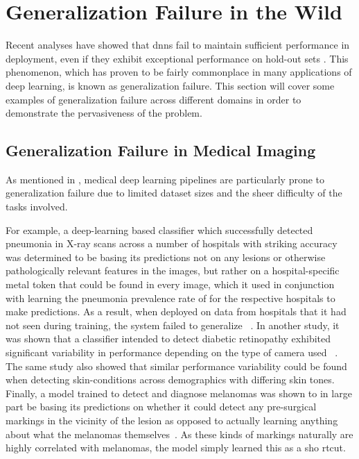 \section{Generalization Failure in the Wild} \label{case_studies}
    Recent analyses have showed that \glspl{dnn} fail to maintain sufficient performance in deployment, even if they exhibit exceptional performance on hold-out sets \cite{damour2020underspecification, endocv2021, shortcut_learning}. This phenomenon, which has proven to be fairly commonplace in many applications of deep learning, is known as generalization failure. This section will cover some examples of generalization failure across different domains in order to demonstrate the pervasiveness of the problem.
    
	\subsection{Generalization Failure in Medical Imaging} \label{gen_failure_med}
	As mentioned in , medical deep learning pipelines are particularly prone to generalization failure due to limited dataset sizes and the sheer difficulty of the tasks involved.
	
	For example, a deep-learning based classifier which successfully detected pneumonia in X-ray scans across a number of hospitals with striking accuracy was determined to be basing its predictions not on any lesions or otherwise pathologically relevant features in the images, but rather on a hospital-specific metal token that could be found in every image, which it used in conjunction with learning the pneumonia prevalence rate of for the respective hospitals to make predictions. As a result, when deployed on data from hospitals that it had not seen during training, the system failed to generalize ~\cite{pneumonia}. In another study, it was shown that a classifier intended to detect diabetic retinopathy exhibited significant variability in performance depending on the type of camera used ~\cite{damour2020underspecification}. The same study also showed that similar performance variability could be found when detecting skin-conditions across demographics with differing skin tones. Finally, a model trained to detect and diagnose melanomas  was shown to in large part be basing its predictions on whether it could detect any pre-surgical markings in the vicinity of the lesion as opposed to actually learning anything about what the melanomas themselves~\cite{skin_shortcut}. As these kinds of markings naturally are highly correlated with melanomas, the model simply learned this as a sho
	rtcut. 
	
